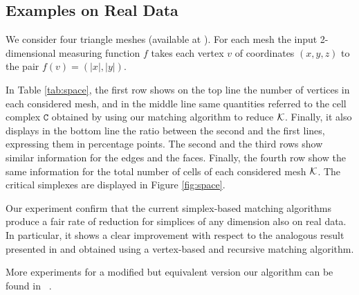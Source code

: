 \documentclass[12pt]{article}
\newcommand{\cK}{{\cal K}}
\newcommand{\sC}{\texttt{C}} \newcommand{\sD}{\texttt{D}} \newcommand{\sM}{\texttt{M}} \newcommand{\sL}{\texttt{L}}
\begin{document}
\subsection{Examples on Real Data}
We consider four triangle meshes (available at \cite{sf}).
For each mesh the input  2-dimensional measuring function $f$
takes each vertex $v$ of coordinates $(x, y, z)$ to the pair $f(v) = (|x|, |y|)$.

In Table \ref{tab:space}, the first row shows on the top line the number of vertices in each considered mesh, and in
the middle line same quantities referred to the cell complex $\sC$
obtained by using our matching algorithm to reduce $\cK$. Finally, it also displays in the bottom line the ratio between
the second and the first lines, expressing them in percentage points.
The second and the third rows show similar information for the edges and the faces. Finally, the fourth row show the same
information for the total number of cells of each considered mesh $\cK$. The critical simplexes are displayed in Figure \ref{fig:space}.


Our experiment confirm that the current simplex-based matching algorithms produce a fair rate of reduction for simplices of any dimension also on real data. In particular, it shows a clear improvement with respect to the analogous result presented in \cite{AlKaLa17} and obtained using a vertex-based and recursive matching algorithm.


More experiments for a modified but equivalent version our algorithm can be found in ~\cite{Iur16}.
\end{document}
